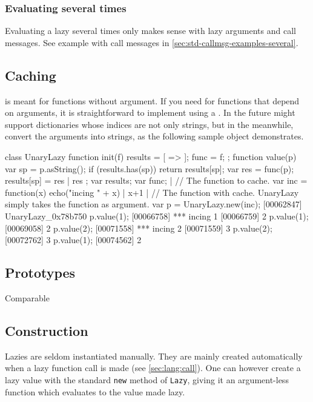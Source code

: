 \subsubsection{Evaluating several times}

Evaluating a lazy several times only makes sense with lazy arguments and
call messages. See example with call messages in
\autoref{sec:std-callmsg-examples-several}.


\subsection{Caching}

 is meant for functions without argument.  If you need
 for functions that depend on arguments, it is straightforward
to implement using a .  In the future \us might
support dictionaries whose indices are not only strings, but in the
meanwhile, convert the arguments into strings, as the following sample
object demonstrates.

\begin{urbiscript}
class UnaryLazy
{
  function init(f)
  {
    results = [ => ];
    func = f;
  };
  function value(p)
  {
    var sp = p.asString();
    if (results.has(sp))
      return results[sp];
    var res = func(p);
    results[sp] = res |
    res
  };
  var results;
  var func;
} |
// The function to cache.
var inc = function(x) { echo("incing " + x) | x+1 } |
// The function with cache. UnaryLazy simply takes the function as argument.
var p = UnaryLazy.new(inc);
[00062847] UnaryLazy_0x78b750
p.value(1);
[00066758] *** incing 1
[00066759] 2
p.value(1);
[00069058] 2
p.value(2);
[00071558] *** incing 2
[00071559] 3
p.value(2);
[00072762] 3
p.value(1);
[00074562] 2
\end{urbiscript}

\subsection{Prototypes}

\begin{refObjects}
\item[Comparable]
\end{refObjects}

\subsection{Construction}

Lazies are seldom instantiated manually. They are mainly created
automatically when a lazy function call is made (see
\autoref{sec:lang:call}). One can however create a lazy value with the
standard \lstinline|new| method of \lstinline|Lazy|, giving it an
argument-less function which evaluates to the value made lazy.

